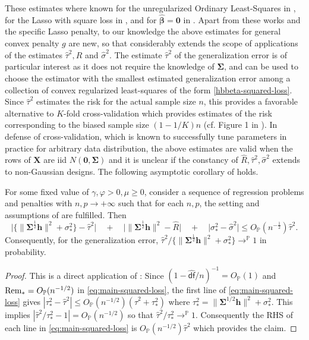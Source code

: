 \documentclass[11pt]{amsart}
\numberwithin{equation}{section}
\numberwithin{equation}{section}
\def\P{{\mathbb{P}}}
\def\Rem{\hbox{\rm Rem}}
\def\mathbold{\boldsymbol} %
\def\bh{\mathbold{h}}\def\hhat{\widehat{h}}\def\htil{\widetilde{h}}
\def\bX{\mathbold{X}}\def\hbX{{\widehat{\bX}}}\def\tbX{{\widetilde{\bX}}}\def\bXbar{{\overline \bX}}
\def\bbeta{\mathbold{\beta}}\def\betahat{\widehat{\beta}}\def\hbeta{\widehat{\beta}}
\def\hbbeta{{{\widehat{\bbeta}}}}
\def\bSigma{\mathbold{\Sigma}}\def\hbSigma{{\widehat{\bSigma}}}
\def\df{{\hat{\mathsf{df}}}{}}
\begin{document}
These estimates where known
for the unregularized Ordinary Least-Squares in \cite{leeb2008evaluation},
for the Lasso with square loss
in \cite{bayati2012lasso,bayati2013estimating,miolane2018distribution},
and for $\hbbeta=\mathbf{0}$ in \cite{dicker2014variance}.
Apart from these works and the specific Lasso penalty,
to our knowledge the above estimates for general convex penalty $g$
are new, so that  considerably extends
the scope of applications of the estimates $\hat \tau^2, \hat R$ and $\hat\sigma^2$.
The estimate $\hat \tau^2$ of the generalization error is
of particular interest as it does not require the knowledge of $\bSigma$,
and can be used to choose the estimator with the smallest estimated
generalization error among a collection of convex regularized least-squares of
the form \eqref{hbbeta-squared-loss}. Since $\hat \tau^2$
estimates the risk for the actual sample size $n$, this provides a favorable
alternative to $K$-fold cross-validation which provides estimates
of the risk corresponding to the biased sample size $(1-1/K)n$
(cf. Figure 1 in \cite{rad2018scalable}).
In defense of cross-validation, which is known to successfully tune
parameters in practice for arbitrary data distribution,
the above estimates are valid 
when the rows of $\bX$ are iid $N(\mathbf{0},\bSigma)$
and it is unclear if the constancy of $\hat R,\hat\tau^2,\hat\sigma^2$
extends to non-Gaussian designs.
The following asymptotic
corollary of  holds.

\begin{corollary}
    \label{corollary:square_loss}
    For some fixed value of $\gamma,\varphi>0,\mu\ge 0$,
    consider a sequence of regression problems and penalties
    with $n,p\to+\infty$ such  that for each $n,p$, the setting and assumptions of
     are fulfilled. Then
\begin{equation*}
\big|
 \big\{\|\bSigma^{\frac12}\bh\|^2 + \sigma_*^2\big\}-\hat \tau^2 \big|
 \quad
 +
 \quad
\big|\|\bSigma^{\frac12}\bh\|^2  -  \hat R \big|
 \quad
+
 \quad
 \big|\sigma_*^2-\hat\sigma^2\big| 
  \le  O_\P(n^{-\frac12}) \hat \tau^2.
\end{equation*}
Consequently, for the generalization error,
$\hat \tau^2/\{\|\bSigma^{\frac12}\bh\|^2 + \sigma_*^2\} \to^\P 1$
in probability.
\end{corollary}
\begin{proof}
This is a direct application of :
Since $(1-\df/n)^{-1} = O_\P(1)$
and $\Rem_*= O_\P(n^{-1/2})$ in \eqref{eq:main-squared-loss},
the first line of \eqref{eq:main-squared-loss} gives
$|\tau_*^2 - \hat \tau^2|
\le O_\P(n^{-1/2})(\hat\tau^2+\tau_*^2)$ where
$\tau_*^2 = \|\bSigma^{1/2}\bh\|^2 + \sigma_*^2$.
This implies $|\hat \tau^2/\tau_*^2 - 1| = O_\P(n^{-1/2})$
so that $\hat \tau^2/\tau_*^2\to^\P 1$.
Consequently the RHS of each line in \eqref{eq:main-squared-loss}
is $O_\P(n^{-1/2})\hat\tau^2$ which provides the claim.
\end{proof}
\end{document}
